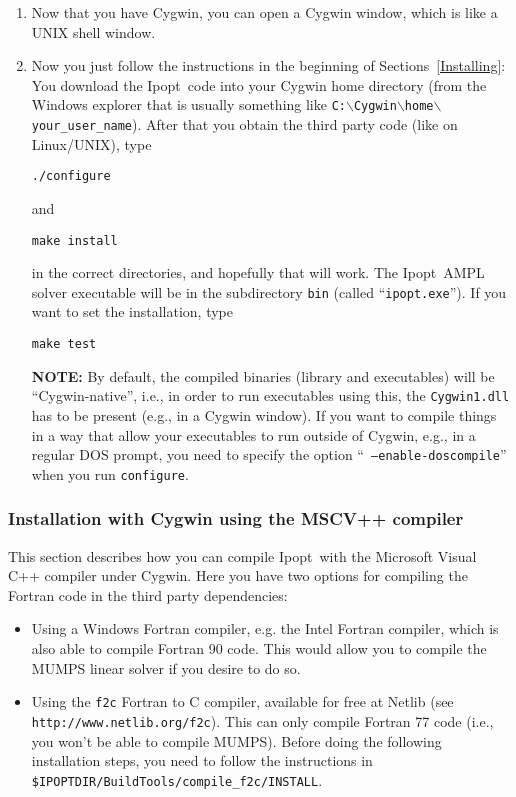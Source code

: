 \documentclass[10pt]{article}
\newcommand{\Ipopt}{{\sc Ipopt}}
\begin{document}
\begin{enumerate}
\item Now that you have Cygwin, you can open a Cygwin window, which is
  like a UNIX shell window.

\item\label{it:cyg_inst} Now you just follow the instructions in the
  beginning of Sections~\ref{Installing}: You download the \Ipopt\
  code into your Cygwin home directory (from the Windows explorer that
  is usually something like
  \texttt{C:$\backslash$Cygwin$\backslash$home$\backslash$your\_user\_name}).
  After that you obtain the third party code (like on Linux/UNIX),
  type

  \texttt{./configure}

  and

  \texttt{make install}

  in the correct directories, and hopefully that will work.  The
  \Ipopt\ AMPL solver executable will be in the subdirectory
  \texttt{bin} (called ``\texttt{ipopt.exe}'').  If you want to set
  the installation, type

  \texttt{make test}

  \textbf{NOTE:} By default, the compiled binaries (library and
  executables) will be ``Cygwin-native'', i.e., in order to run
  executables using this, the {\tt Cygwin1.dll} has to be present
  (e.g., in a Cygwin window).  If you want to compile things in a way
  that allow your executables to run outside of Cygwin, e.g., in a
  regular DOS prompt, you need to specify the option ``{\tt
    --enable-doscompile}'' when you run {\tt configure}.
\end{enumerate}

\subsubsection{Installation with Cygwin using the MSCV++ compiler}
\label{CygwinInstallNative}

This section describes how you can compile \Ipopt\ with the Microsoft
Visual C++ compiler under Cygwin.  Here you have two options for
compiling the Fortran code in the third party dependencies:

\begin{itemize}
\item Using a Windows Fortran compiler, e.g. the Intel Fortran
  compiler, which is also able to compile Fortran 90 code.  This would
  allow you to compile the MUMPS linear solver if you desire to do so.
\item Using the {\tt f2c} Fortran to C compiler, available for free at
  Netlib (see {\tt http://www.netlib.org/f2c}).  This can only compile
  Fortran 77 code (i.e., you won't be able to compile MUMPS).  Before
  doing the following installation steps, you need to follow the
  instructions in\\ {\tt\$IPOPTDIR/BuildTools/compile\_f2c/INSTALL}.
\end{itemize}
\end{document}
